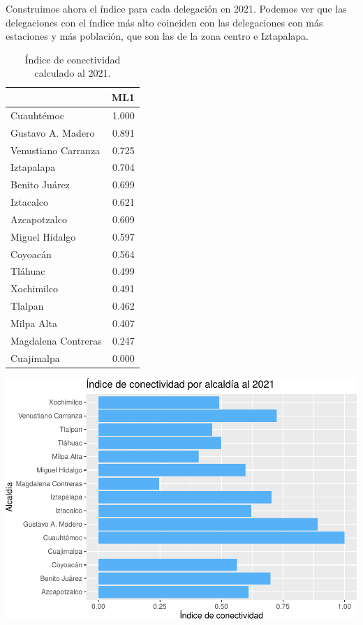 \documentclass[
  spanish,
]{article}
\begin{document}
Construimos ahora el índice para cada delegación en 2021. Podemos ver
que las delegaciones con el índice más alto coinciden con las
delegaciones con más estaciones y más población, que son las de la zona
centro e Iztapalapa.

\begin{table}

\caption{\label{tab:unnamed-chunk-23}Índice de conectividad calculado al 2021.}
\centering
\begin{tabular}[t]{lr}
\toprule
  & ML1\\
\midrule
Cuauhtémoc & 1.000\\
Gustavo A. Madero & 0.891\\
Venustiano Carranza & 0.725\\
Iztapalapa & 0.704\\
Benito Juárez & 0.699\\
Iztacalco & 0.621\\
Azcapotzalco & 0.609\\
Miguel Hidalgo & 0.597\\
Coyoacán & 0.564\\
Tláhuac & 0.499\\
Xochimilco & 0.491\\
Tlalpan & 0.462\\
Milpa Alta & 0.407\\
Magdalena Contreras & 0.247\\
Cuajimalpa & 0.000\\
\bottomrule
\end{tabular}
\end{table}

\begin{center}\includegraphics{proyecto_files/figure-latex/unnamed-chunk-24-1} \end{center}
\end{document}

